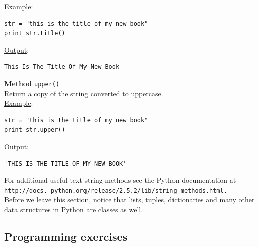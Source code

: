 \noindent
\underline{Example}:
\begin{verbatim}
str = "this is the title of my new book"
print str.title()
\end{verbatim}
\underline{Output}:
\begin{verbatim}
This Is The Title Of My New Book
\end{verbatim}
\vspace{4mm}

\noindent
{\bf Method} {\tt upper()}\\
Return a copy of the string converted to uppercase.\\

\noindent
\underline{Example}:
\begin{verbatim}
str = "this is the title of my new book"
print str.upper()
\end{verbatim}
\underline{Output}:
\begin{verbatim}
'THIS IS THE TITLE OF MY NEW BOOK'
\end{verbatim}
\vspace{4mm}

\noindent
For additional useful text string methods see the Python documentation at 
{\tt http://docs. python.org/release/2.5.2/lib/string-methods.html.} \\

\noindent
Before we
leave this section, notice that lists, tuples, dictionaries and many other 
data structures in Python are classes as well.



\subsection{Programming exercises}\label{subsec:obj}

